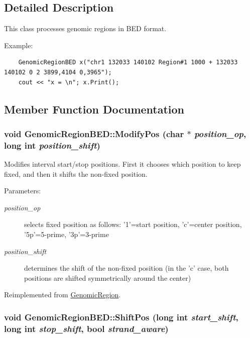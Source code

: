 \subsection{Detailed Description}
This class processes genomic regions in BED format. 

Example: 

\begin{Code}\begin{verbatim}    GenomicRegionBED x("chr1 132033 140102 Region#1 1000 + 132033 140102 0 2 3899,4104 0,3965");
    cout << "x = \n"; x.Print();
\end{verbatim}
\end{Code}

 

\subsection{Member Function Documentation}
\hypertarget{classGenomicRegionBED_c515c70f443db400f911452ed359433b}{
\subsubsection[ModifyPos]{\setlength{\rightskip}{0pt plus 5cm}void GenomicRegionBED::ModifyPos (char $\ast$ {\em position\_\-op}, \/  long int {\em position\_\-shift})}}
\label{classGenomicRegionBED_c515c70f443db400f911452ed359433b}


Modifies interval start/stop positions. First it chooses which position to keep fixed, and then it shifts the non-fixed position. 

\begin{Desc}
\item[Parameters:]
\begin{description}
\item[{\em position\_\-op}]selects fixed position as follows: '1'=start position, 'c'=center position, '5p'=5-prime, '3p'=3-prime \item[{\em position\_\-shift}]determines the shift of the non-fixed position (in the 'c' case, both positions are shifted symmetrically around the center) \end{description}
\end{Desc}


Reimplemented from \hyperlink{classGenomicRegion_0721b07af0850057e4ab9cd416ecac2f}{GenomicRegion}.\hypertarget{classGenomicRegionBED_fd2f05cec2af5186794f40f221e040b1}{
\subsubsection[ShiftPos]{\setlength{\rightskip}{0pt plus 5cm}void GenomicRegionBED::ShiftPos (long int {\em start\_\-shift}, \/  long int {\em stop\_\-shift}, \/  bool {\em strand\_\-aware})}}
\label{classGenomicRegionBED_fd2f05cec2af5186794f40f221e040b1}


